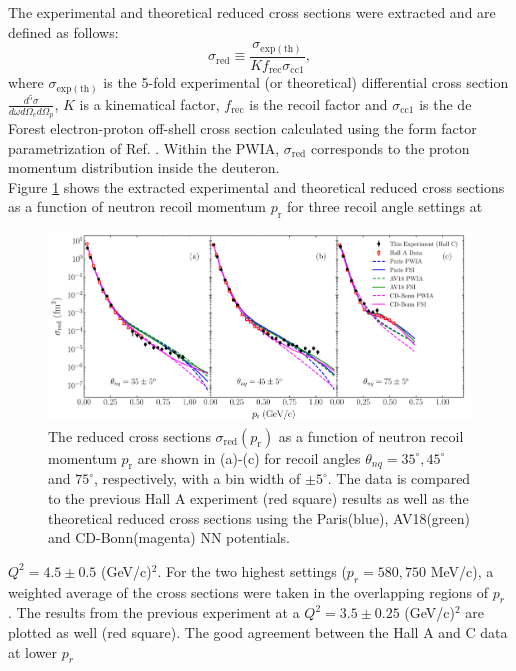 \indent The experimental and theoretical reduced cross sections were extracted and are defined as follows:
\begin{equation}
\sigma_{\mathrm{red}} \equiv \frac{\sigma_{\mathrm{exp(th)}}}{Kf_{\mathrm{rec}}\sigma_{\mathrm{cc1}}},
\label{eq:1}
\end{equation}
where $\sigma_{\mathrm{exp(th)}}$ is the 5-fold experimental (or theoretical) differential cross section $\frac{d^{5}\sigma}{d\omega d\Omega_{e} d\Omega_{p}}$, $K$ is a kinematical factor, $f_{\mathrm{rec}}$ is the recoil factor and $\sigma_{\mathrm{cc1}}$ is the de Forest \cite{DEFOREST1983} electron-proton off-shell cross section calculated using the form factor parametrization of Ref. \cite{PhysRevC.69.022201}.
Within the PWIA, $\sigma_{\mathrm{red}}$ corresponds to the proton momentum distribution inside the deuteron. \\
\indent Figure \ref{fig:fig1} shows the extracted experimental and theoretical reduced cross sections as a function of neutron recoil momentum
$p_{\mathrm{r}}$ for three recoil angle settings at
\onecolumngrid
\begin{center}
\begin{figure}[hb!]
\includegraphics[scale=0.46]{prl_plots/PRL_plot1.pdf}
\caption{The reduced cross sections $\sigma_{\mathrm{red}}(p_{\mathrm{r}})$ as a function of neutron recoil momentum $p_{\mathrm{r}}$ are shown in (a)-(c) for recoil angles $\theta_{nq}=35^{\circ}, 45^{\circ}$ and $75^{\circ}$, respectively,
with a bin width of $\pm 5^{\circ}$. The data is compared to the previous Hall A experiment (red square) results \cite{PhysRevLett.107.262501} as well as the theoretical reduced cross sections using the Paris(blue),
AV18(green) and CD-Bonn(magenta) NN potentials.}
\label{fig:fig1}
\end{figure}
\end{center}
\twocolumngrid
\noindent $Q^{2}=4.5\pm0.5$ (GeV/c)$^{2}$. For the two highest settings ($p_{r}=580, 750$ MeV/c), a weighted average of the cross sections were taken in the overlapping regions of $p_{r}$ . The results from the previous experiment \cite{PhysRevLett.107.262501} at a $Q^{2}=3.5\pm0.25$ (GeV/c)$^{2}$ are plotted as well (red square). The good agreement between the Hall A and C data at lower $p_{r}$
